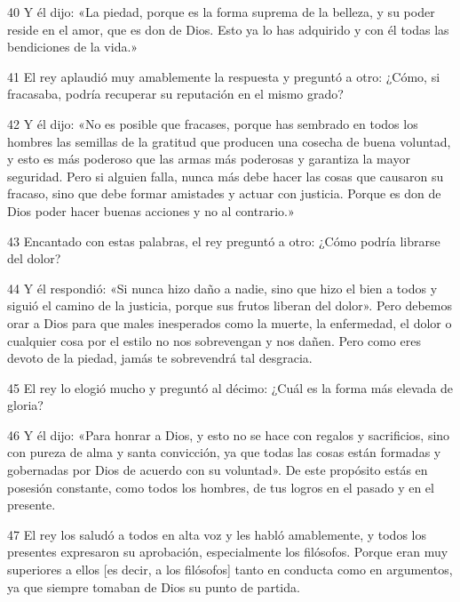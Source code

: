 \par 40 Y él dijo: «La piedad, porque es la forma suprema de la belleza, y su poder reside en el amor, que es don de Dios. Esto ya lo has adquirido y con él todas las bendiciones de la vida.»

\par 41 El rey aplaudió muy amablemente la respuesta y preguntó a otro: ¿Cómo, si fracasaba, podría recuperar su reputación en el mismo grado?

\par 42 Y él dijo: «No es posible que fracases, porque has sembrado en todos los hombres las semillas de la gratitud que producen una cosecha de buena voluntad, y esto es más poderoso que las armas más poderosas y garantiza la mayor seguridad. Pero si alguien falla, nunca más debe hacer las cosas que causaron su fracaso, sino que debe formar amistades y actuar con justicia. Porque es don de Dios poder hacer buenas acciones y no al contrario.»

\par 43 Encantado con estas palabras, el rey preguntó a otro: ¿Cómo podría librarse del dolor?

\par 44 Y él respondió: «Si nunca hizo daño a nadie, sino que hizo el bien a todos y siguió el camino de la justicia, porque sus frutos liberan del dolor». Pero debemos orar a Dios para que males inesperados como la muerte, la enfermedad, el dolor o cualquier cosa por el estilo no nos sobrevengan y nos dañen. Pero como eres devoto de la piedad, jamás te sobrevendrá tal desgracia.

\par 45 El rey lo elogió mucho y preguntó al décimo: ¿Cuál es la forma más elevada de gloria?

\par 46 Y él dijo: «Para honrar a Dios, y esto no se hace con regalos y sacrificios, sino con pureza de alma y santa convicción, ya que todas las cosas están formadas y gobernadas por Dios de acuerdo con su voluntad». De este propósito estás en posesión constante, como todos los hombres, de tus logros en el pasado y en el presente.

\par 47 El rey los saludó a todos en alta voz y les habló amablemente, y todos los presentes expresaron su aprobación, especialmente los filósofos. Porque eran muy superiores a ellos [es decir, a los filósofos] tanto en conducta como en argumentos, ya que siempre tomaban de Dios su punto de partida.

